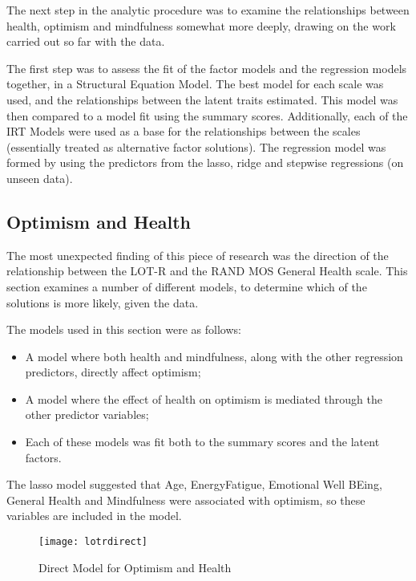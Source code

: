 \documentclass{article}
\begin{document}
The next step in the analytic procedure was to examine the relationships between health, optimism and mindfulness somewhat more deeply, drawing on the work carried out so far with the data. 

The first step was to assess the fit of the factor models and the regression models together, in a Structural Equation Model. The best model for each scale was used, and the relationships between the latent traits estimated. This model was then compared to a model fit using the summary scores. Additionally, each of the IRT Models were used as a base for the relationships between the scales (essentially treated as alternative factor solutions). The regression model was formed by using the predictors from the lasso, ridge and stepwise regressions (on unseen data). 


\subsection{Optimism and Health}
\label{sec:optimism-health}

The most unexpected finding of this piece of research was the direction of the relationship between the LOT-R and the RAND MOS General Health scale. This section examines a number of different models, to determine which of the solutions is more likely, given the data. 

The models used in this section were as follows:

\begin{itemize}
\item A model where both health and mindfulness, along with the other regression predictors, directly affect optimism;

\item A model where the effect of health on optimism is mediated through the other predictor variables;

\item Each of these models was fit both to the summary scores and the latent factors.
\end{itemize}

The lasso model suggested that Age, EnergyFatigue, Emotional Well BEing, General Health and Mindfulness were associated with optimism, so these variables are included in the model. 



\begin{figure}
\texttt{[image: lotrdirect]}  
  \caption{Direct Model for Optimism and Health}
  \label{fig:lotrdirect}
\end{figure}
\end{document}
